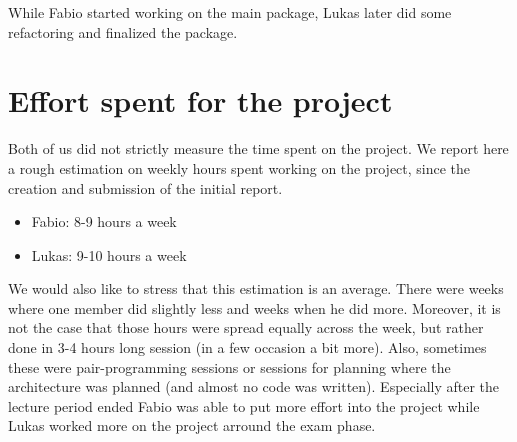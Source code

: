 \documentclass[a4paper,english,10pt,NET]{tumarticle}
\begin{document}
While Fabio started working on the main package, Lukas later did some refactoring and finalized the package.

\section{Effort spent for the project}
Both of us did not strictly measure the time spent on the project. We report here a rough estimation on weekly hours spent working on the project, since the creation and submission of the initial report.

\begin{itemize}
	\item Fabio: 8-9 hours a week
	\item Lukas: 9-10 hours a week
\end{itemize}

We would also like to stress that this estimation is an average.
There were weeks where one member did slightly less and weeks when he did more.
Moreover, it is not the case that those hours were spread equally across the week, but rather done in 3-4 hours long session (in a few occasion a bit more).
Also, sometimes these were pair-programming sessions or sessions for planning where the architecture was planned (and almost no code was written).
Especially after the lecture period ended Fabio was able to put more effort into the project while Lukas worked more on the project arround the exam phase.

\todos
\end{document}
